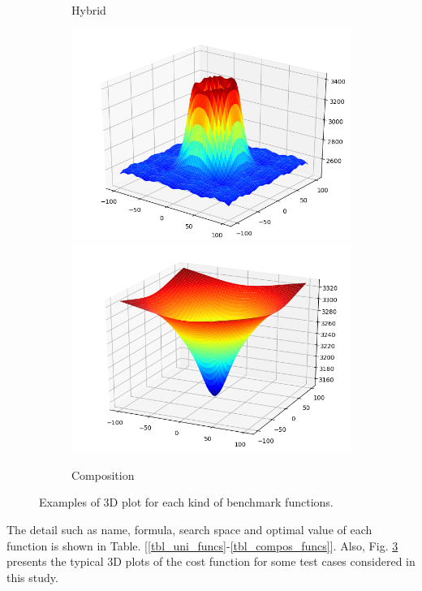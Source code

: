 \documentclass[a4paper,13pt,2p]{report}
\begin{document}
\begin{figure}[!ht]
\begin{subfigure}{0.24\textwidth}
  	 \caption{Hybrid}
  	\label{subfig:hybrid}
  	\end{subfigure}
  	\begin{subfigure}{0.24\textwidth}
   	\includegraphics[width=1\linewidth]{png/functions/compos_f26}
  	 \includegraphics[width=1\linewidth]{png/functions/compos_f30}
  	 \caption{Composition}
  	\label{subfig:compos}
  	\end{subfigure}
  \caption{Examples of 3D plot for each kind of benchmark functions.} 
  \label{fig_functions} 
\end{figure}

The detail such as name, formula, search space and optimal value of each function is shown in Table. [\ref{tbl_uni_funcs}-\ref{tbl_compos_funcs}]. Also, Fig. \ref{fig_functions} presents the typical 3D plots of the cost function for some test cases considered in this study. 
\end{document}
